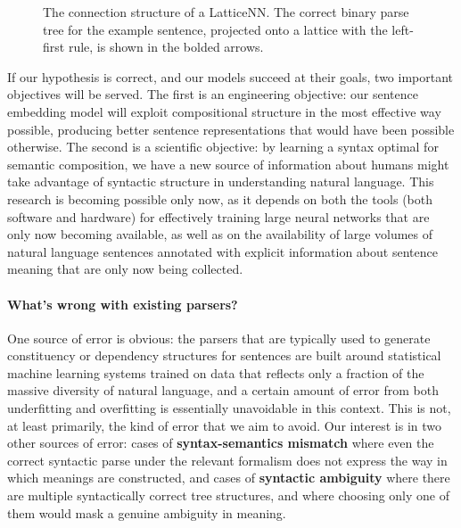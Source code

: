\begin{figure}[tp]
  \centering\small
 	

        \caption{The connection structure of a LatticeNN. The correct binary parse tree for the example sentence, projected onto a lattice with the left-first rule, is shown in the bolded arrows.}
  \label{lattice-fig1}
\end{figure}


If our hypothesis is correct, and our models succeed at their goals, two important objectives will be served. The first is an engineering objective: our sentence embedding model will exploit compositional structure in the most effective way possible, producing better sentence representations that would have been possible otherwise. The second is a scientific objective: by learning a syntax optimal for semantic composition, we have a new source of information about humans might take advantage of syntactic structure in understanding natural language. This research is becoming possible only now, as it depends on both the tools (both software and hardware) for effectively training large neural networks that are only now becoming available, as well as on the availability of large volumes of natural language sentences annotated with explicit information about sentence meaning that are only now being collected.

\paragraph{What's wrong with existing parsers?} One source of error is obvious: the parsers that are typically used to generate constituency or dependency structures for sentences are built around statistical machine learning systems trained on data that reflects only a fraction of the massive diversity of natural language, and a certain amount of error from both underfitting and overfitting is essentially unavoidable in this context. This is not, at least primarily, the kind of error that we aim to avoid. Our interest is in two other sources of error: cases of \textbf{syntax-semantics mismatch} where even the correct syntactic parse under the relevant formalism does not express the way in which meanings are constructed, and cases of \textbf{syntactic ambiguity} where there are multiple syntactically correct tree structures, and where choosing only one of them would mask a genuine ambiguity in meaning.


